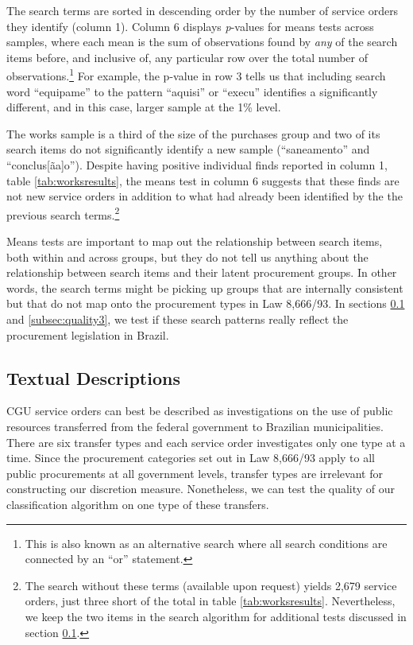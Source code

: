 \documentclass[11pt]{article}
\begin{document}
The search terms are sorted in descending order by the number of service orders they identify (column 1). Column 6 displays \emph{p}-values for means tests across samples, where each mean is the sum of observations found by \emph{any} of the search items before, and inclusive of, any particular row over the total number of observations.\footnote{This is also known as an alternative search where all search conditions are connected by an ``or'' statement.} For example, the p-value in row 3 tells us that including search word ``equipame'' to the pattern ``aquisi'' or ``execu'' identifies a significantly different, and in this case, larger sample at the 1\% level.

The works sample is a third of the size of the purchases group and two of its search items do not significantly identify a new sample (``saneamento'' and ``conclus{[}ãa{]}o''). Despite having positive individual finds reported in column 1, table \ref{tab:worksresults}, the means test in column 6 suggests that these finds are not new service orders in addition to what had already been identified by the the previous search terms.\footnote{The search without these terms (available upon request) yields 2,679 service orders, just three short of the total in table \ref{tab:worksresults}. Nevertheless, we keep the two items in the search algorithm for additional tests discussed in section \ref{subsec:quality2}.}


Means tests are important to map out the relationship between search items, both within and across groups, but they do not tell us anything about the relationship between search items and their latent procurement groups. In other words, the search terms might be picking up groups that are internally consistent but that do not map onto the procurement types in Law 8,666/93. In sections \ref{subsec:quality2} and \ref{subsec:quality3}, we test if these search patterns really reflect the procurement legislation in Brazil.

\subsection{Textual Descriptions}\label{subsec:quality2}

CGU service orders can best be described as investigations on the use of
public resources transferred from the federal government to Brazilian
municipalities. There are six transfer types and each service order
investigates only one type at a time. Since the procurement categories
set out in Law 8,666/93 apply to all public procurements at all
government levels, transfer types are irrelevant for constructing our
discretion measure. Nonetheless, we can test the quality of our classification algorithm on one type of these transfers.
\end{document}
